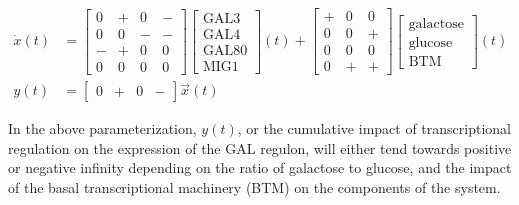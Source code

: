\documentclass[11 pt]{article}
\begin{document}
    \begin{align*}
      \dot{x}(t) &= \begin{bmatrix} 0 & + & 0 & - \\ 0 & 0 & - & - \\ - & + & 0 & 0 \\ 0 & 0 & 0 & 0 \end{bmatrix} \begin{bmatrix} \text{GAL3} \\ \text{GAL4} \\ \text{GAL80} \\ \text{MIG1} \end{bmatrix}(t) + \begin{bmatrix} + & 0 & 0 \\ 0 & 0 & + \\ 0 & 0 & 0 \\ 0 & + & + \end{bmatrix} \begin{bmatrix} \text{galactose} \\ \text{glucose} \\ \text{BTM} \end{bmatrix}(t) \\
        y(t) &= \begin{bmatrix} 0 & + & 0 & - \end{bmatrix} \vec{x}(t)
    \end{align*}

    In the above parameterization, $y(t)$, or the cumulative impact of transcriptional regulation on the expression of the GAL regulon, will either tend towards positive or negative infinity depending on the ratio of galactose to glucose, and the impact of the basal transcriptional machinery (BTM) on the components of the system.
\end{document}
